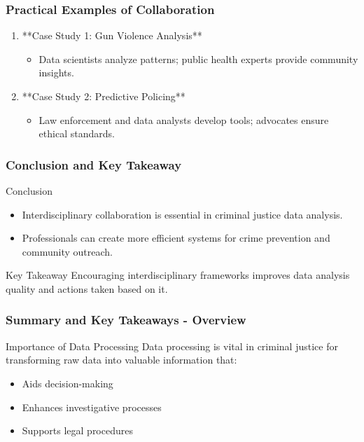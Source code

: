 \documentclass[aspectratio=169]{beamer}
\begin{document}
\begin{frame}[fragile]
    \frametitle{Practical Examples of Collaboration}
    \begin{enumerate}
        \item **Case Study 1: Gun Violence Analysis**
            \begin{itemize}
                \item Data scientists analyze patterns; public health experts provide community insights.
            \end{itemize}
        \item **Case Study 2: Predictive Policing**
            \begin{itemize}
                \item Law enforcement and data analysts develop tools; advocates ensure ethical standards.
            \end{itemize}
    \end{enumerate}
\end{frame}

\begin{frame}[fragile]
    \frametitle{Conclusion and Key Takeaway}
    \begin{block}{Conclusion}
        \begin{itemize}
            \item Interdisciplinary collaboration is essential in criminal justice data analysis.
            \item Professionals can create more efficient systems for crime prevention and community outreach.
        \end{itemize}
    \end{block}
    \begin{block}{Key Takeaway}
        Encouraging interdisciplinary frameworks improves data analysis quality and actions taken based on it.
    \end{block}
\end{frame}

\begin{frame}[fragile]
  \frametitle{Summary and Key Takeaways - Overview}
  \begin{block}{Importance of Data Processing}
    Data processing is vital in criminal justice for transforming raw data into valuable information that:
    \begin{itemize}
      \item Aids decision-making
      \item Enhances investigative processes
      \item Supports legal procedures
    \end{itemize}
  \end{block}
\end{frame}
\end{document}

